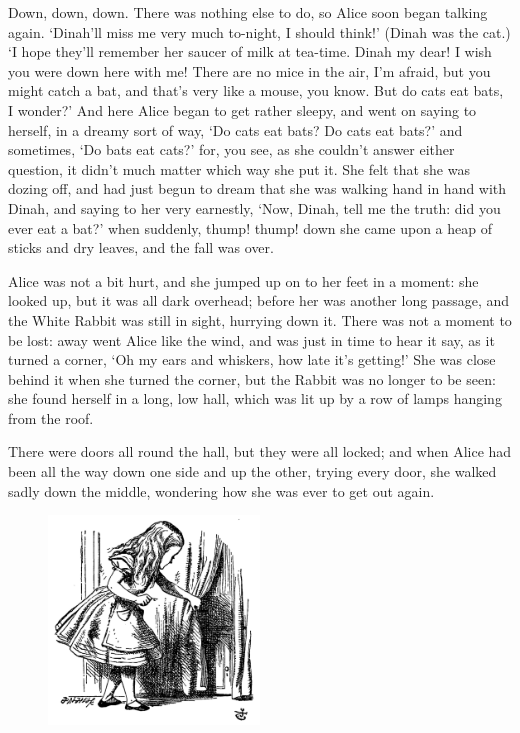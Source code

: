 \documentclass[12pt,openany]{memoir}
\begin{document}
Down, down, down. There was nothing else to do, so Alice soon began talking again. `Dinah'll miss me very much to-night, I should think!' (Dinah was the cat.) `I hope they'll remember her saucer of milk at tea-time. Dinah my dear! I wish you were down here with me! There are no mice in the air, I'm afraid, but you might catch a bat, and that's very like a mouse, you know. But do cats eat bats, I wonder?' And here Alice began to get rather sleepy, and went on saying to herself, in a dreamy sort of way, `Do cats eat bats? Do cats eat bats?' and sometimes, `Do bats eat cats?' for, you see, as she couldn't answer either question, it didn't much matter which way she put it. She felt that she was dozing off, and had just begun to dream that she was walking hand in hand with Dinah, and saying to her very earnestly, `Now, Dinah, tell me the truth: did you ever eat a bat?' when suddenly, thump! thump! down she came upon a heap of sticks and dry leaves, and the fall was over.

Alice was not a bit hurt, and she jumped up on to her feet in a moment: she looked up, but it was all dark overhead; before her was another long passage, and the White Rabbit was still in sight, hurrying down it. There was not a moment to be lost: away went Alice like the wind, and was just in time to hear it say, as it turned a corner, `Oh my ears and whiskers, how late it's getting!' She was close behind it when she turned the corner, but the Rabbit was no longer to be seen: she found herself in a long, low hall, which was lit up by a row of lamps hanging from the roof.

There were doors all round the hall, but they were all locked; and when Alice had been all the way down one side and up the other, trying every door, she walked sadly down the middle, wondering how she was ever to get out again.

\begin{figure}
  \includegraphics[width=0.5\textwidth]{illustrations/pic_03.jpg}
\end{figure}
\end{document}
